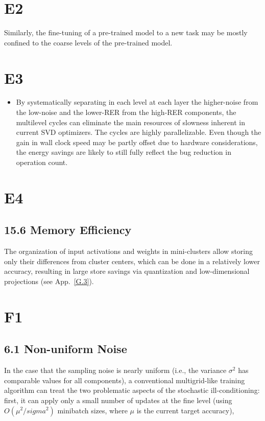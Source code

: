 \documentclass{article} %
\begin{document}
\section{E2}
Similarly, the fine-tuning of a pre-trained model to a new task may be mostly confined to the coarse levels of the pre-trained model.

\section{E3}
\begin{itemize}
    \item By systematically separating in each level at each layer the higher-noise from the low-noise and the lower-RER from the high-RER components, the multilevel cycles can eliminate the main resources of slowness inherent in current SVD optimizers. The cycles are highly parallelizable. Even though the gain in wall clock speed may be partly offset due to hardware considerations, the energy savings are likely to still fully reflect the bug reduction in operation count.
\end{itemize}

\section{E4}
\subsection{15.6 Memory Efficiency}
The organization of input activations and weights in mini-clusters allow storing only their differences from cluster centers, which can be done in a relatively lower accuracy, resulting in large store savings via quantization and low-dimensional projections (see App.~\ref{G.3}).

\section{F1}
\subsection{6.1 Non-uniform Noise}
In the case that the sampling noise is nearly uniform (i.e., the variance $\sigma^2$ has comparable values for all components), a conventional multigrid-like training algorithm can treat the two problematic aspects of the stochastic ill-conditioning: first, it can apply only a small number of updates at the fine level (using $O(\mu^2/sigma^2)$ minibatch sizes, where $\mu$ is the current target accuracy),
\end{document}
